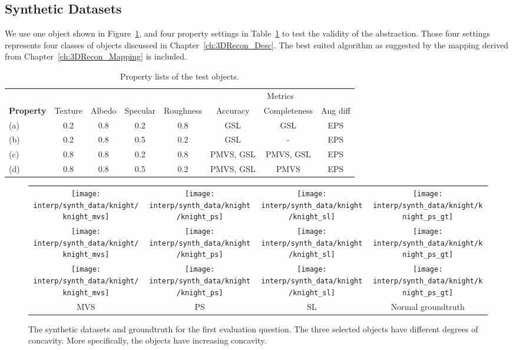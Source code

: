\subsection{Synthetic Datasets}
We use one object shown in Figure~\ref{fig:synth_data}, and four property settings in Table~\ref{tab:prop_list_synth_data} to test the validity of the abstraction. Those four settings represents four classes of objects discussed in Chapter~\ref{ch:3DRecon_Desc}. The best suited algorithm as suggested by the mapping derived from Chapter~\ref{ch:3DRecon_Mapping} is included.
\begin{table}[!htbp]
  \centering
  \begin{tabular}{l*{4}{c}|*{3}{c}}
  \hline
  & & & & & \multicolumn{3}{c}{Metrics}\\
  \textbf{Property} & Texture & Albedo & Specular & Roughness & Accuracy & Completeness & Ang diff\\
  \hline
  (a) & 0.2 & 0.8 & 0.2 & 0.8 & GSL & GSL & EPS\\
  (b) & 0.2 & 0.8 & 0.5 & 0.2 & GSL & - & EPS \\
  (c) & 0.8 & 0.8 & 0.2 & 0.8 & PMVS, GSL & PMVS, GSL & EPS \\
  (d) & 0.8 & 0.8 & 0.5 & 0.2 & PMVS, GSL & PMVS & EPS\\
  \hline
  \end{tabular}
  \caption{Property lists of the test objects.}
  \label{tab:prop_list_synth_data}
\end{table}

\begin{figure}[!htbp]
\centering
\begin{tabular}{cccc}
  \texttt{[image: interp/synth\_data/knight/knight\_mvs]}&
  \texttt{[image: interp/synth\_data/knight/knight\_ps]}&
  \texttt{[image: interp/synth\_data/knight/knight\_sl]}&
  \texttt{[image: interp/synth\_data/knight/knight\_ps\_gt]}\\
  \texttt{[image: interp/synth\_data/knight/knight\_mvs]}&
  \texttt{[image: interp/synth\_data/knight/knight\_ps]}&
  \texttt{[image: interp/synth\_data/knight/knight\_sl]}&
  \texttt{[image: interp/synth\_data/knight/knight\_ps\_gt]}\\
  \texttt{[image: interp/synth\_data/knight/knight\_mvs]}&
  \texttt{[image: interp/synth\_data/knight/knight\_ps]}&
  \texttt{[image: interp/synth\_data/knight/knight\_sl]}&
  \texttt{[image: interp/synth\_data/knight/knight\_ps\_gt]}\\
  MVS & PS & SL & Normal groundtruth\\
\end{tabular}
\caption{The synthetic datasets and groundtruth for the first evaluation question. The three selected objects have different degrees of concavity. More specifically, the objects have increasing concavity.}
\label{fig:synth_data}
\end{figure}

